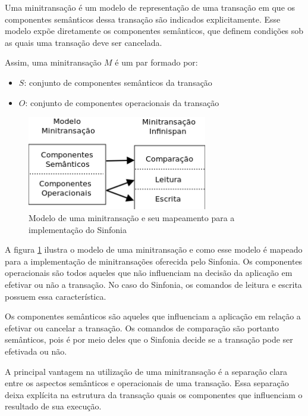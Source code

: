 \documentclass[11pt,twoside,a4paper]{book}
\begin{document}
Uma minitransação é um modelo de representação de uma transação em que os componentes semânticos dessa transação são indicados explicitamente. Esse modelo expõe diretamente os componentes semânticos, que definem condições sob as quais uma transação deve ser cancelada.

Assim, uma minitransação $M$ é um par formado por:

\begin{itemize}
	\item $S$: conjunto de componentes semânticos da transação
	\item $O$: conjunto de componentes operacionais da transação
\end{itemize}

\begin{figure}
  \centering
  \includegraphics[width=0.7\textwidth]{mapeamento_minitransacao} 
  \caption{Modelo de uma minitransação e seu mapeamento para a implementação do Sinfonia}
  \label{fig:mapeamento_minitransacao} 
\end{figure}

A figura \ref{fig:mapeamento_minitransacao} ilustra o modelo de uma minitransação e como esse modelo é mapeado para a implementação de minitransações oferecida pelo Sinfonia. Os componentes operacionais são todos aqueles que não influenciam na decisão da aplicação em efetivar ou não a transação. No caso do Sinfonia, os comandos de leitura e escrita possuem essa característica.

Os componentes semânticos são aqueles que influenciam a aplicação em relação a efetivar ou cancelar a transação. Os comandos de comparação são portanto semânticos, pois é por meio deles que o Sinfonia decide se a transação pode ser efetivada ou não.

A principal vantagem na utilização de uma minitransação é a separação clara entre os aspectos semânticos e operacionais de uma transação. Essa separação deixa explícita na estrutura da transação quais os componentes que influenciam o resultado de sua execução.
\end{document}
